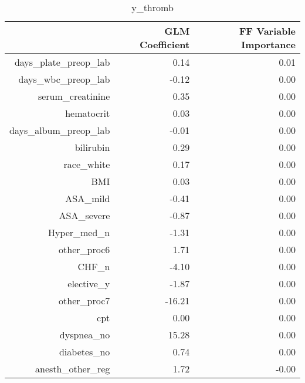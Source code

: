 \begin{table}[ht]
\centering
\begin{tabular}{rrr}
  \hline
 & GLM Coefficient & FF Variable Importance \\ 
  \hline
days\_plate\_preop\_lab & 0.14 & 0.01 \\ 
  days\_wbc\_preop\_lab & -0.12 & 0.00 \\ 
  serum\_creatinine & 0.35 & 0.00 \\ 
  hematocrit & 0.03 & 0.00 \\ 
  days\_album\_preop\_lab & -0.01 & 0.00 \\ 
  bilirubin & 0.29 & 0.00 \\ 
  race\_white & 0.17 & 0.00 \\ 
  BMI & 0.03 & 0.00 \\ 
  ASA\_mild & -0.41 & 0.00 \\ 
  ASA\_severe & -0.87 & 0.00 \\ 
  Hyper\_med\_n & -1.31 & 0.00 \\ 
  other\_proc6 & 1.71 & 0.00 \\ 
  CHF\_n & -4.10 & 0.00 \\ 
  elective\_y & -1.87 & 0.00 \\ 
  other\_proc7 & -16.21 & 0.00 \\ 
  cpt & 0.00 & 0.00 \\ 
  dyspnea\_no & 15.28 & 0.00 \\ 
  diabetes\_no & 0.74 & 0.00 \\ 
  anesth\_other\_reg & 1.72 & -0.00 \\ 
   \hline
\end{tabular}
\caption{y_thromb} 
\end{table}

